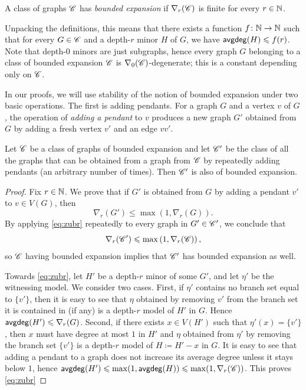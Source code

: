 \begin{definition}
	A class of graphs $\mathscr C$ has \emph{bounded expansion} if $\nabla_r(\mathscr C)$ is finite for every $r\in \mathbb{N}$. 
\end{definition}

Unpacking the definitions, this means that there exists a function $f\colon \mathbb{N}\to \mathbb{N}$ such that for every $G\in \mathscr C$ and a depth-$r$ minor $H$ of $G$, we have $\mathsf{avgdeg}(H)\leqslant f(r)$. Note that depth-$0$ minors are just subgraphs, hence every graph $G$ belonging to a class of bounded expansion $\mathscr C$ is $\nabla_0(\mathscr C)$-degenerate; this is a constant depending only on $\mathscr C$.

In our proofs, we will use stability of the notion of bounded expansion under two basic operations. The first is adding pendants.
For a graph $G$ and a vertex $v$ of $G$, the operation of \emph{adding a pendant} to $v$ produces a new graph $G'$ obtained from $G$ by adding a fresh vertex $v'$ and an edge $vv'$.
	
\begin{lemma} \label{obs:pendants-bnd-exp}
	Let $\mathscr C$ be a class of graphs of bounded expansion and let $\mathscr C'$ be the class of all the graphs that can be obtained from a graph from $\mathscr C$ by repeatedly adding pendants (an arbitrary number of times). Then $\mathscr C'$ is also of bounded expansion.
\end{lemma}
\begin{proof}
	Fix $r\in \mathbb{N}$.
	We prove that if $G'$ is obtained from $G$ by adding a pendant $v'$ to $v\in V(G)$, then
	\begin{equation}\label{eq:zubr}
		\nabla_r(G')\leq \max\left(1,\nabla_r(G)\right).
	\end{equation}
	By applying \eqref{eq:zubr} repeatedly to every graph in $G'\in \mathscr C'$, we conclude that
	\[\nabla_r(\mathscr C')\leqslant \max\left(1,\nabla_r(\mathscr C)\right),\]
	so $\mathscr C$ having bounded expansion implies that $\mathscr C'$ has bounded expansion as well.
	
	Towards \eqref{eq:zubr}, let $H'$ be a depth-$r$ minor of some $G'$, and let $\eta'$ be the witnessing model. We consider two cases. First, if $\eta'$ contains no branch set equal to $\{v'\}$, then it is easy to see that $\eta$ obtained by removing $v'$ from the branch set it is contained in (if any) is a depth-$r$ model of $H'$ in $G$. Hence $\mathsf{avgdeg}(H')\leqslant \nabla_r(G)$. Second, if there exists $x\in V(H')$ such that $\eta'(x)=\{v'\}$, then $x$ must have degree at most $1$ in $H'$ and $\eta$ obtained from $\eta'$ by removing the branch set $\{v'\}$ is a depth-$r$ model of $H\coloneqq H'-x$ in $G$. It is easy to see that adding a pendant to a graph does not increase its average degree unless it stays below $1$, hence $\mathsf{avgdeg}(H')\leqslant \max(1,\mathsf{avgdeg}(H))\leqslant \max(1,\nabla_r(\mathscr C))$. This proves \eqref{eq:zubr} 
\end{proof}

